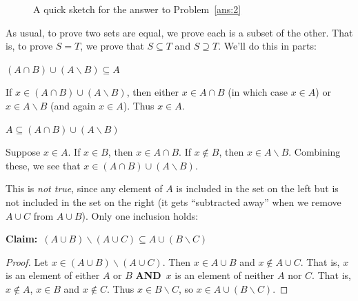 \documentclass[12pt,letterpaper]{article}
\begin{document}
\begin{enumerate}
\begin{figure}[htbp]
    \caption{A quick sketch for the answer to Problem~\ref{ans:2}}
    \label{fig:ans2}
  \end{figure}
  As usual, to prove two sets are equal, we prove each is a subset of
  the other.  That is, to prove $S=T$, we prove that $S\subseteq T$ and
  $S\supseteq T$.  We'll do this in parts:
  \begin{enumerate}
    \Part $(A\cap B) \cup (A\smallsetminus B) \subseteq A$

    If $x \in (A\cap B) \cup (A\smallsetminus B)$, then either $x\in A
    \cap B$ (in which case $x\in A$) or $x\in A\smallsetminus B$ (and
    again $x\in A$).  Thus $x\in A$.
    \medskip

    \Part $A \subseteq (A\cap B) \cup (A\smallsetminus B)$

    Suppose $x\in A$.  If $x\in B$, then $x\in A\cap B$.  If $x\not\in
    B$, then $x\in A\smallsetminus B$.  Combining these, we see that
    $x\in (A\cap B) \cup (A\smallsetminus B)$.

  \end{enumerate}

  \Answer This is \emph{not true}, since any element of $A$ is
  included in the set on the left but is not included in the set on
  the right (it gets ``subtracted away'' when we remove $A\cup C$ from
  $A\cup B$).  Only one inclusion holds:
  \medskip

  \textbf{Claim:}\ $(A\cup B) \smallsetminus (A\cup C) \subseteq A\cup (B\smallsetminus C)$

  \begin{proof}
    Let $x\in (A\cup B) \smallsetminus (A\cup C)$.  Then $x\in A\cup
    B$ and $x\not\in A\cup C$.  That is, $x$ is an element of either
    $A$ or $B$ \textbf{AND}\ $x$ is an element of neither $A$ nor $C$.
    That is, $x\not\in A$, $x\in B$ and $x\not\in C$.  Thus $x\in
    B\smallsetminus C$, so $x\in A \cup (B\smallsetminus C)$.
  \end{proof}



\end{enumerate}
\end{document}
